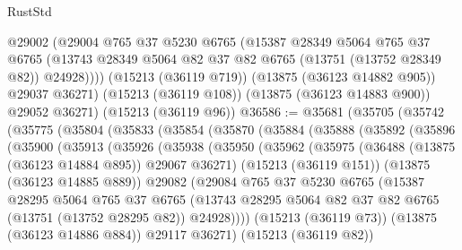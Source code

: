 \begin{lexlean}{RustStd}
\begin{coremodule}
          @29002
          (@29004
            @765
            @37
            @5230
            @6765
            (@15387
              @28349
              @5064
              @765
              @37
              @6765
              (@13743 @28349 @5064 @82 @37 @82 @6765 (@13751 (@13752 @28349 @82)) @24928))))
        (@15213 (@36119 @719))
        (@13875 (@36123 @14882 @905))
        @29037
        @36271)
      (@15213 (@36119 @108))
      (@13875 (@36123 @14883 @900))
      @29052
      @36271)
    (@15213 (@36119 @96))
@36586 := @35681
    (@35705
      (@35742
        (@35775
          (@35804
            (@35833
              (@35854
                (@35870
                  (@35884
                    (@35888
                      (@35892
                        (@35896
                          (@35900
                            (@35913
                              (@35926
                                (@35938
                                  (@35950
                                    (@35962
                                      (@35975
                                        (@36488 (@13875 (@36123 @14884 @895)) @29067 @36271)
                                        (@15213 (@36119 @151))
                                        (@13875 (@36123 @14885 @889))
                                        @29082
                                        (@29084
                                          @765
                                          @37
                                          @5230
                                          @6765
                                          (@15387
                                            @28295
                                            @5064
                                            @765
                                            @37
                                            @6765
                                            (@13743
                                              @28295
                                              @5064
                                              @82
                                              @37
                                              @82
                                              @6765
                                              (@13751 (@13752 @28295 @82))
                                              @24928))))
                                      (@15213 (@36119 @73))
                                      (@13875 (@36123 @14886 @884))
                                      @29117
                                      @36271)
                                    (@15213 (@36119 @82))

\end{coremodule}
\end{lexlean}
